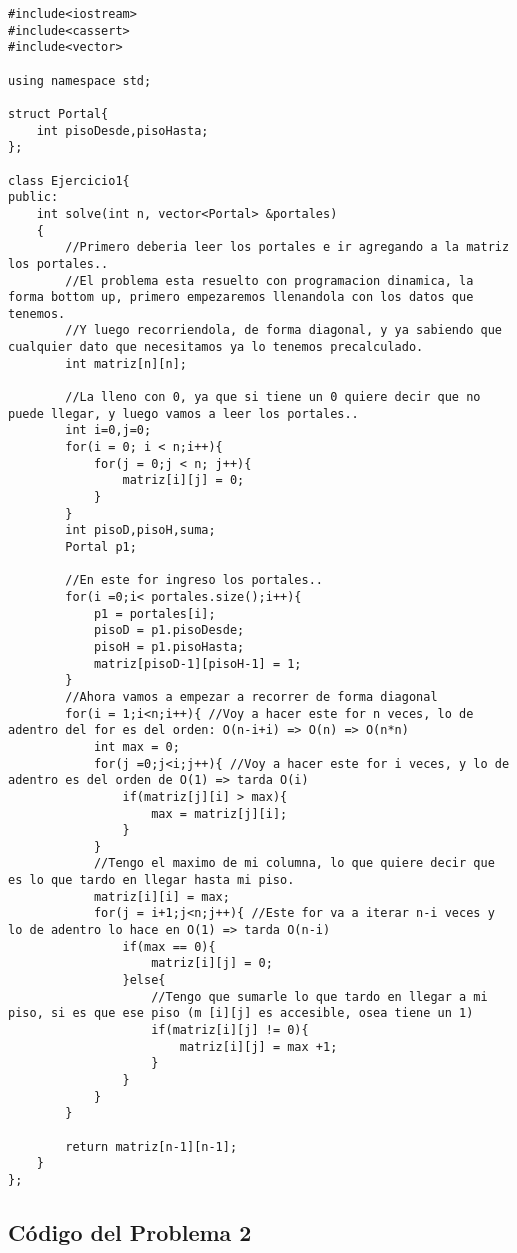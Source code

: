 \documentclass[a4paper]{article}
\begin{document}
\begin{lstlisting}[style=customc]
#include<iostream>
#include<cassert>
#include<vector>

using namespace std;

struct Portal{
    int pisoDesde,pisoHasta;
};

class Ejercicio1{
public:
    int solve(int n, vector<Portal> &portales)
    {
		//Primero deberia leer los portales e ir agregando a la matriz los portales..
		//El problema esta resuelto con programacion dinamica, la forma bottom up, primero empezaremos llenandola con los datos que tenemos.
		//Y luego recorriendola, de forma diagonal, y ya sabiendo que cualquier dato que necesitamos ya lo tenemos precalculado.
		int matriz[n][n];
		
		//La lleno con 0, ya que si tiene un 0 quiere decir que no puede llegar, y luego vamos a leer los portales..
		int i=0,j=0;
		for(i = 0; i < n;i++){
			for(j = 0;j < n; j++){
				matriz[i][j] = 0;
			}
		}
		int pisoD,pisoH,suma;
		Portal p1;
		
		//En este for ingreso los portales..
		for(i =0;i< portales.size();i++){
			p1 = portales[i];
			pisoD = p1.pisoDesde;
			pisoH = p1.pisoHasta;
			matriz[pisoD-1][pisoH-1] = 1;
		}
		//Ahora vamos a empezar a recorrer de forma diagonal
		for(i = 1;i<n;i++){ //Voy a hacer este for n veces, lo de adentro del for es del orden: O(n-i+i) => O(n) => O(n*n)
			int max = 0;
			for(j =0;j<i;j++){ //Voy a hacer este for i veces, y lo de adentro es del orden de O(1) => tarda O(i)
				if(matriz[j][i] > max){
					max = matriz[j][i];
				}
			}
			//Tengo el maximo de mi columna, lo que quiere decir que es lo que tardo en llegar hasta mi piso.
			matriz[i][i] = max;
			for(j = i+1;j<n;j++){ //Este for va a iterar n-i veces y lo de adentro lo hace en O(1) => tarda O(n-i)
				if(max == 0){
					matriz[i][j] = 0;
				}else{
					//Tengo que sumarle lo que tardo en llegar a mi piso, si es que ese piso (m [i][j] es accesible, osea tiene un 1)
					if(matriz[i][j] != 0){
						matriz[i][j] = max +1;
					}
				}
			}
		}

		return matriz[n-1][n-1];
    }
};
\end{lstlisting}


\subsection{Código del Problema 2}
\end{document}
